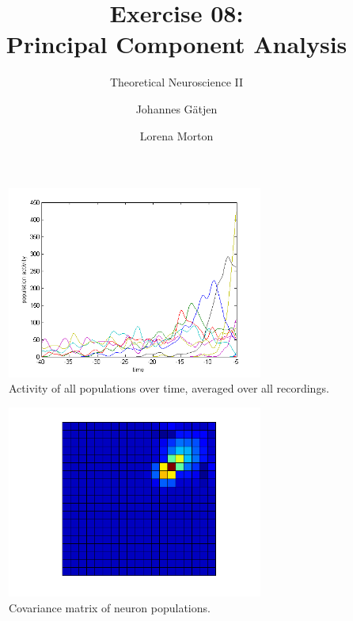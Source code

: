\documentclass{scrartcl}
\title{Exercise 08:\\Principal Component Analysis}
\subtitle{Theoretical Neuroscience II}
\author{Johannes G\"atjen \and Lorena Morton}
\begin{document}
\maketitle


\begin{figure}[h]
\centering
\includegraphics[trim = {0.7cm 0.3cm 1cm 0.7cm}, width=0.75\textwidth, clip]{../pics/orig_time}
\caption{Activity of all populations over time, averaged over all recordings.}
\label{}
\end{figure}

\begin{figure}[h]
\centering
\includegraphics[trim = {1.7cm 0.5cm 1cm 1.7cm}, width=0.75\textwidth, clip]{../pics/orig_cov}
\caption{Covariance matrix of neuron populations.}
\label{}
\end{figure}
\end{document}
